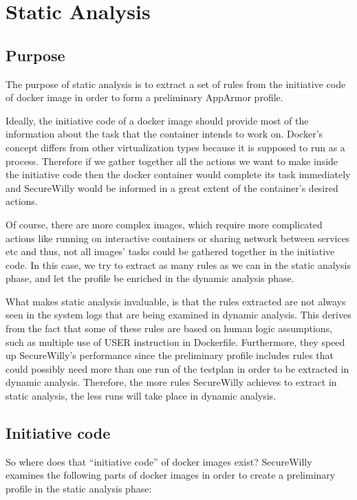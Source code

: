 \section{Static Analysis}
\subsection{Purpose}
The purpose of static analysis is to extract a set of rules from the initiative code of docker image in order to form a preliminary AppArmor profile.

Ideally, the initiative code of a docker image should provide most of the information about the task that the container intends to work on. Docker's concept differs from other virtualization types because it is supposed to run as a process. Therefore if we gather together all the actions we want to make inside the initiative code then the docker container would complete its task immediately and SecureWilly would be informed in a great extent of the container's desired actions.

Of course, there are more complex images, which require more complicated actions like running on interactive containers or sharing network between services etc and thus, not all images' tasks could be gathered together in the initiative code. In this case, we try to extract as many rules as we can in the static analysis phase, and let the profile be enriched in the dynamic analysis phase.
 
What makes static analysis invaluable, is that the rules extracted are not always seen in the system logs that are being examined in dynamic analysis. This derives from the fact that some of these rules are based on human logic assumptions, such as multiple use of USER instruction in Dockerfile. Furthermore, they speed up SecureWilly's performance since the preliminary profile includes rules that could possibly need more than one run of the testplan in order to be extracted in dynamic analysis. Therefore, the more rules SecureWilly achieves to extract in static analysis, the less runs will take place in dynamic analysis.

\subsection{Initiative code}
So where does that “initiative code” of docker images exist?
SecureWilly examines the following parts of docker images in order to create  a preliminary profile in the static analysis phase:

